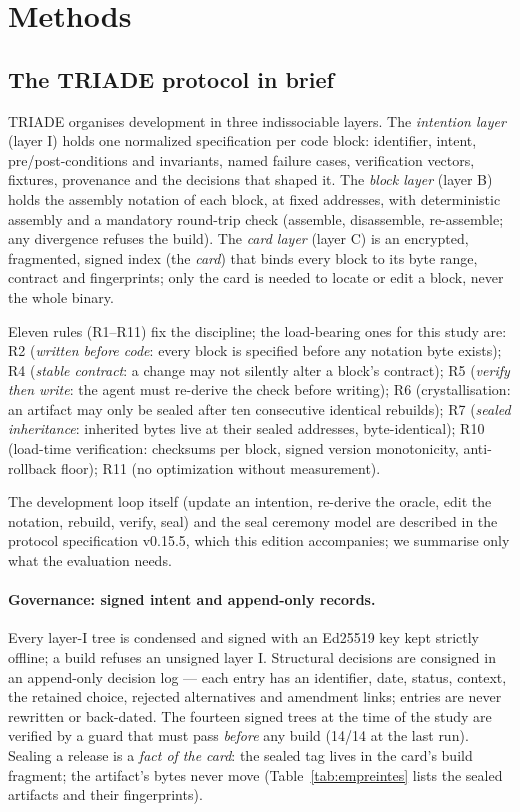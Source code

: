 \documentclass[11pt,a4paper]{article}
\begin{document}
\section{Methods}\label{sec:methods}

\subsection{The TRIADE protocol in brief}\label{sec:protocole}

TRIADE organises development in three indissociable layers. The
\emph{intention layer} (layer I) holds one normalized specification per
code block: identifier, intent, pre/post-conditions and invariants, named
failure cases, verification vectors, fixtures, provenance and the
decisions that shaped it. The \emph{block layer} (layer B) holds the
assembly notation of each block, at fixed addresses, with deterministic
assembly and a mandatory round-trip check (assemble, disassemble,
re-assemble; any divergence refuses the build). The \emph{card layer}
(layer C) is an encrypted, fragmented, signed index (the \emph{card}) that
binds every block to its byte range, contract and fingerprints; only the
card is needed to locate or edit a block, never the whole binary.

Eleven rules (R1--R11) fix the discipline; the load-bearing ones for this
study are: R2 (\emph{written before code}: every block is specified before
any notation byte exists); R4 (\emph{stable contract}: a change may not
silently alter a block's contract); R5 (\emph{verify then write}: the
agent must re-derive the check before writing); R6 (crystallisation: an
artifact may only be sealed after ten consecutive identical rebuilds);
R7 (\emph{sealed inheritance}: inherited bytes live at their sealed
addresses, byte-identical); R10 (load-time verification: checksums per
block, signed version monotonicity, anti-rollback floor); R11 (no
optimization without measurement).

The development loop itself (update an intention, re-derive the oracle,
edit the notation, rebuild, verify, seal) and the seal ceremony model are
described in the protocol specification v0.15.5, which this edition
accompanies; we summarise only what the evaluation needs.

\paragraph{Governance: signed intent and append-only records.}
Every layer-I tree is condensed and signed with an Ed25519 key kept
strictly offline; a build refuses an unsigned layer I. Structural
decisions are consigned in an append-only decision log --- each entry has
an identifier, date, status, context, the retained choice, rejected
alternatives and amendment links; entries are never rewritten or
back-dated. The fourteen signed trees at the time of the study are verified
by a guard that must pass \emph{before} any build (14/14 at the last
run). Sealing a release is a \emph{fact of the card}: the sealed tag
lives in the card's build fragment; the artifact's bytes never move
(Table~\ref{tab:empreintes} lists the sealed artifacts and their
fingerprints).
\end{document}
